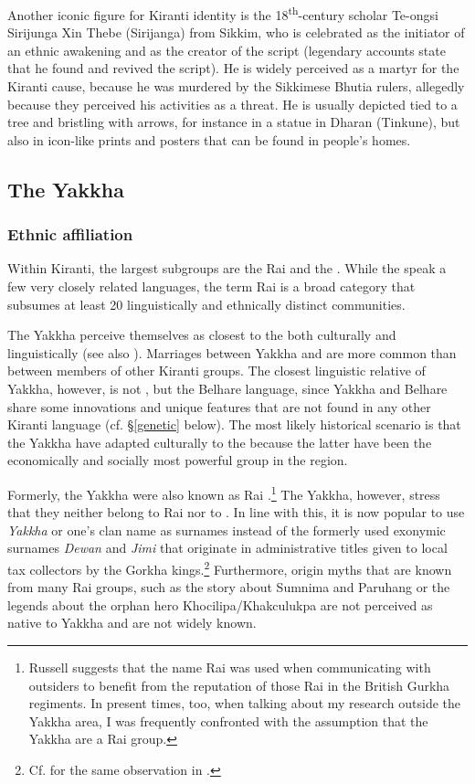 Another iconic figure for Kiranti identity is the 18\textsuperscript{th}-century  scholar Te-ongsi Sirijunga Xin Thebe (Sirijanga) from Sikkim, who is celebrated as the initiator of an ethnic awakening and as the creator of the  script (legendary accounts state that he found and revived the script). He is widely perceived as a martyr for the Kiranti cause, because he was  murdered by the Sikkimese Bhutia rulers, allegedly because they perceived his activities as a threat. He is usually depicted tied to a tree and bristling with arrows, for instance in a statue in Dharan (Tinkune), but also in icon-like prints and posters that can be found in people's homes.


\subsection{The Yakkha}

\subsubsection{Ethnic affiliation}

Within Kiranti, the largest subgroups are the Rai and the . While the  speak a few very closely related languages, the term Rai is a broad category that subsumes at least 20 linguistically and ethnically distinct communities.  

The Yakkha perceive themselves as closest to the  both culturally and linguistically (see also \citet[90]{Russell1992_Yakha}). Marriages between Yakkha and  are more common than between members of other Kiranti groups. The closest linguistic relative of Yakkha, however, is not , but the Belhare language, since Yakkha and Belhare share some innovations and unique features that are not found in any other Kiranti language (cf. §\ref{genetic} below). The most likely historical scenario is that the Yakkha have adapted culturally to the  because the latter have been  the economically and socially most powerful group in the region. 

Formerly, the Yakkha were also known as Rai \citep[90]{Russell1992_Yakha}.\footnote{Russell suggests that the name Rai was used when communicating with outsiders to benefit from the reputation of those Rai in the British Gurkha regiments. In present times, too, when talking about my research outside the Yakkha area, I was frequently confronted with the assumption that the Yakkha are a Rai group.}  The Yakkha, however, stress that they neither belong to Rai nor to . In line with this, it is now popular to use \emph{Yakkha} or one's  clan name as surnames instead of the formerly used exonymic surnames \emph{Dewan} and \emph{Jimi} that originate in  administrative titles given to local tax collectors by the Gorkha kings.\footnote{Cf. \citet[8]{Doornenbal2009A-grammar} for the same observation in .} Furthermore,  origin myths that are known from many Rai groups, such as the story about Sumnima and Paruhang or the legends about the orphan hero Khocilipa/Khakculukpa \citep{Ebert2003Camling, Gaenszle2000Origins} are not perceived as native to Yakkha and are not widely known. 

